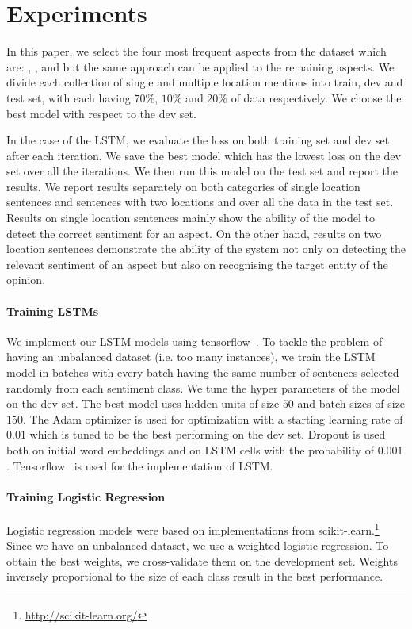 \documentclass[11pt]{article}
\begin{document}
\section{Experiments}
    In this paper, we select the four most frequent aspects from the dataset which are: , ,  and  but the same approach can be applied to the remaining aspects. %
    We divide each collection of single and multiple location mentions into train, dev and test set, with each having $70\%$, $10\%$ and $20\%$ of data respectively. We choose the best model with respect to the dev set. 
    
    In the case of the LSTM, we evaluate the loss on both training set and dev set after each iteration. We save the best model which has the lowest loss on the dev set over all the iterations. We then run this model on the test set and report the results. %
    We report results separately on both categories of single location sentences and sentences with two locations and over all the data in the test set. Results on single location sentences mainly show the ability of the model to detect the correct sentiment for an aspect. On the other hand, results on two location sentences demonstrate the ability of the system not only on detecting the relevant sentiment of an aspect but also on recognising the target entity of the opinion.
    \paragraph{Training LSTMs} 
    We implement our LSTM models using tensorflow~\cite{tensorflow2015_whitepaper}. To tackle the problem of having an unbalanced dataset (i.e. too many  instances), we train the LSTM model in batches with every batch having the same number of sentences selected randomly from each sentiment class. We tune the hyper parameters of the model on the dev set. The best model uses hidden units of size $50$ and batch sizes of size $150$. The Adam optimizer is used for optimization with a starting learning rate of $0.01$ which is tuned to be the best performing on the dev set. Dropout is used both on initial word embeddings and on LSTM cells with the probability of $0.001$. Tensorflow~\cite{tensorflow2015_whitepaper} is used for the implementation of LSTM.
    \paragraph{Training Logistic Regression}
    Logistic regression models were based on implementations from scikit-learn.\footnote{\url{http://scikit-learn.org/}} Since we have an unbalanced dataset, we use a weighted logistic regression. To obtain the best weights, we cross-validate them on the development set. Weights inversely proportional to the size of each class result in the best performance.
\end{document}
